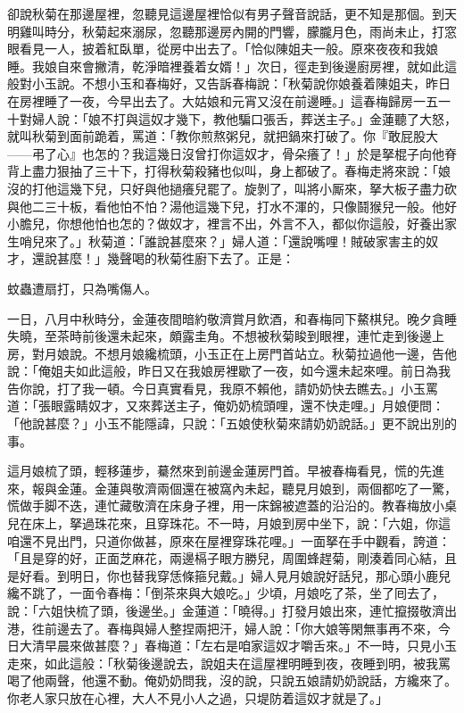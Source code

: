 卻說秋菊在那邊屋裡，忽聽見這邊屋裡恰似有男子聲音說話，更不知是那個。到天明雞叫時分，秋菊起來溺尿，忽聽那邊房內開的門響，朦朧月色，雨尚未止，打窓眼看見一人，披着紅臥單，從房中出去了。「恰似陳姐夫一般。{}原來夜夜和我娘睡。我娘自來會撇清，乾淨暗裡養着女婿！」次日，徑走到後邊廚房裡，就如此這般對小玉說。不想小玉和春梅好，又告訴春梅說：「秋菊說你娘養着陳姐夫，昨日在房裡睡了一夜，今早出去了。大姑娘和元宵又沒在前邊睡。」這春梅歸房一五一十對婦人說：「娘不打與這奴才幾下，教他騙口張舌，葬送主子。」金蓮聽了大怒，就叫秋菊到面前跪着，罵道：「教你煎熬粥兒，就把鍋來打破了。你『敢屁股大——弔了心』也怎的？我這幾日沒曾打你這奴才，骨朵癢了！」於是拏棍子向他脊背上盡力狠抽了三十下，打得秋菊殺豬也似叫，身上都破了。{}春梅走將來說：「娘沒的打他這幾下兒，只好與他撾癢兒罷了。旋剝了，叫將小厮來，拏大板子盡力砍與他二三十板，看他怕不怕？湯他這幾下兒，打水不渾的，只像鬪猴兒一般。他好小膽兒，你想他怕也怎的？做奴才，裡言不出，外言不入，都似你這般，好養出家生哨兒來了。」{}秋菊道：「誰說甚麼來？」婦人道：「還說嘴哩！賊破家害主的奴才，還說甚麼！」幾聲喝的秋菊徃廚下去了。正是：

\begin{myquote}
蚊蟲遭扇打，只為嘴傷人。
\end{myquote}

一日，八月中秋時分，金蓮夜間暗約敬濟賞月飲酒，和春梅同下鰲棋兒。晚夕貪睡失曉，至茶時前後還未起來，頗露圭角。不想被秋菊睃到眼裡，連忙走到後邊上房，對月娘說。不想月娘纔梳頭，小玉正在上房門首站立。秋菊拉過他一邊，告他說：「俺姐夫如此這般，昨日又在我娘房裡歇了一夜，如今還未起來哩。前日為我告你說，打了我一頓。今日真實看見，我原不賴他，請奶奶快去瞧去。」小玉罵道：「張眼露睛奴才，又來葬送主子，俺奶奶梳頭哩，還不快走哩。」月娘便問：「他說甚麼？」小玉不能隱諱，只說：「五娘使秋菊來請奶奶說話。」更不說出別的事。

這月娘梳了頭，輕移蓮步，驀然來到前邊金蓮房門首。早被春梅看見，慌的先進來，報與金蓮。金蓮與敬濟兩個還在被窩內未起，聽見月娘到，兩個都吃了一驚，慌做手脚不迭，連忙藏敬濟在床身子裡，用一床錦被遮蓋的沿沿的。{}教春梅放小桌兒在床上，拏過珠花來，且穿珠花。不一時，月娘到房中坐下，說：「六姐，你這咱還不見出門，只道你做甚，原來在屋裡穿珠花哩。」一面拏在手中觀看，誇道：「且是穿的好，正面芝麻花，兩邊槅子眼方勝兒，周圍蜂趕菊，剛湊着同心結，且是好看。到明日，你也替我穿恁條箍兒戴。」婦人見月娘說好話兒，那心頭小鹿兒纔不跳了，一面令春梅：「倒茶來與大娘吃。」少頃，月娘吃了茶，坐了囘去了，說：「六姐快梳了頭，後邊坐。」金蓮道：「曉得。」打發月娘出來，連忙攛掇敬濟出港，徃前邊去了。春梅與婦人整捏兩把汗，婦人說：「你大娘等閑無事再不來，今日大清早晨來做甚麼？」春梅道：「左右是咱家這奴才嚼舌來。」不一時，只見小玉走來，如此這般：「秋菊後邊說去，說姐夫在這屋裡明睡到夜，夜睡到明，被我罵喝了他兩聲，他還不動。{}俺奶奶問我，沒的說，只說五娘請奶奶說話，方纔來了。你老人家只放在心裡，大人不見小人之過，只堤防着這奴才就是了。」

